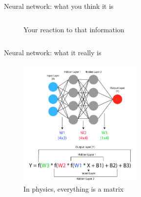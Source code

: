 \documentclass{beamer}
\begin{document}
\begin{frame}{Neural network: what you think it is}
\begin{columns}
\begin{column}{0.5\textwidth}
\begin{figure}
        \caption{Your reaction to that information}
    \end{figure}
\end{column}
\end{columns}
\end{frame}

\begin{frame}{Neural network: what it really is}
    \begin{figure}
        \centering
        \includegraphics[width=0.55\textwidth]{reality.png}
        \caption{In physics, everything is a matrix}
    \end{figure}
\end{frame}
\end{document}
